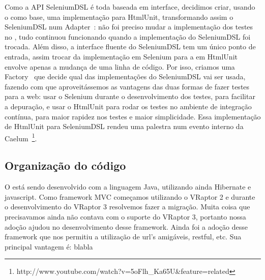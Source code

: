 Como a API SeleniumDSL é toda baseada em interface, decidimos criar, usando o \calopsita como base, uma implementação para
HtmlUnit, transformando assim o SeleniumDSL num Adapter~\cite{gof}: não foi preciso mudar a implementação dos testes no 
\calopsita, tudo continuou funcionando quando a implementação do SeleniumDSL foi trocada. Além disso, a interface fluente
do SeleniumDSL tem um único ponto de entrada, assim trocar da implementação em Selenium para a em HtmlUnit envolve apenas
a mudança de uma linha de código. Por isso, criamos uma Factory~\cite{gof} que decide qual das implementações do SeleniumDSL
vai ser usada, fazendo com que aproveitássemos as vantagens das duas formas de fazer testes para a web: usar o Selenium 
durante o desenvolvimento dos testes, para facilitar a depuração, e usar o HtmlUnit para rodar os testes no ambiente de
integração contínua, para maior rapidez nos testes e maior simplicidade. Essa implementação de HtmlUnit
para SeleniumDSL rendeu uma palestra num evento interno da Caelum~\footnote{http://www.youtube.com/watch?v=5oFlh\_Ka65U\&feature=related}.


\subsection{Organização do código}
O \calopsita está sendo desenvolvido com a linguagem Java, utilizando ainda Hibernate e javascript. Como 
framework MVC começamos utilizando o VRaptor 2 e durante o desenvolvimento do VRaptor 3 resolvemos fazer a migração. 
Muita coisa que precisavamos ainda não contava com o suporte do VRaptor 3, portanto nossa adoção ajudou no 
desenvolvimento desse framework. Ainda foi a adoção desse framework que nos permitiu a utilização de url's 
amigáveis, restful, etc. Sua principal vantagem é: blabla
